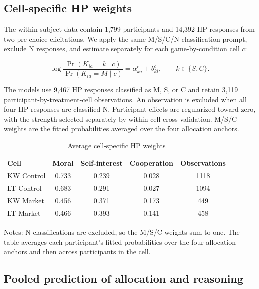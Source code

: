 \documentclass{article}
\begin{document}
\subsection{Cell-specific HP weights}

The within-subject data contain 1,799 participants and 14,392 HP responses from two pre-choice elicitations. We apply the same M/S/C/N classification prompt, exclude N responses, and estimate separately for each game-by-condition cell $c$:

\begin{equation}
\log\frac{\Pr(K_{ia}=k\mid c)}{\Pr(K_{ia}=M\mid c)}=\alpha^c_{ka}+b^c_{ki},\qquad k\in\{S,C\}.
\end{equation}

The models use 9,467 HP responses classified as M, S, or C and retain 3,119 participant-by-treatment-cell observations. An observation is excluded when all four HP responses are classified N. Participant effects are regularized toward zero, with the strength selected separately by within-cell cross-validation. M/S/C weights are the fitted probabilities averaged over the four allocation anchors.

\begin{table}[H]
\centering
\caption{Average cell-specific HP weights}
\label{tab:within_first_stage_cells}
\begin{tabular}{lcccc}
\toprule
Cell & Moral & Self-interest & Cooperation & Observations\\
\midrule
KW Control & 0.733 & 0.239 & 0.028 & 1118 \\
LT Control & 0.683 & 0.291 & 0.027 & 1094 \\
KW Market & 0.456 & 0.371 & 0.173 & 449 \\
LT Market & 0.466 & 0.393 & 0.141 & 458  \\
\bottomrule
\end{tabular}
\begin{flushleft}
\footnotesize Notes: N classifications are excluded, so the M/S/C weights sum to one. The table averages each participant's fitted probabilities over the four allocation anchors and then across participants in the cell.
\end{flushleft}
\end{table}

\subsection{Pooled prediction of allocation and reasoning}
\end{document}
